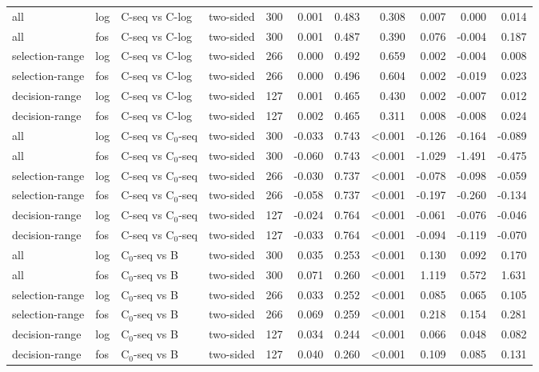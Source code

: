 \begin{longtable}{llllrrrrrrr}
all & log & C-seq vs C-log & two-sided & 300 & 0.001 & 0.483 & 0.308 & 0.007 & 0.000 & 0.014 \\
all & fos & C-seq vs C-log & two-sided & 300 & 0.001 & 0.487 & 0.390 & 0.076 & -0.004 & 0.187 \\
selection-range & log & C-seq vs C-log & two-sided & 266 & 0.000 & 0.492 & 0.659 & 0.002 & -0.004 & 0.008 \\
selection-range & fos & C-seq vs C-log & two-sided & 266 & 0.000 & 0.496 & 0.604 & 0.002 & -0.019 & 0.023 \\
decision-range & log & C-seq vs C-log & two-sided & 127 & 0.001 & 0.465 & 0.430 & 0.002 & -0.007 & 0.012 \\
decision-range & fos & C-seq vs C-log & two-sided & 127 & 0.002 & 0.465 & 0.311 & 0.008 & -0.008 & 0.024 \\
all & log & C-seq vs C$_0$-seq & two-sided & 300 & -0.033 & 0.743 & <0.001 & -0.126 & -0.164 & -0.089 \\
all & fos & C-seq vs C$_0$-seq & two-sided & 300 & -0.060 & 0.743 & <0.001 & -1.029 & -1.491 & -0.475 \\
selection-range & log & C-seq vs C$_0$-seq & two-sided & 266 & -0.030 & 0.737 & <0.001 & -0.078 & -0.098 & -0.059 \\
selection-range & fos & C-seq vs C$_0$-seq & two-sided & 266 & -0.058 & 0.737 & <0.001 & -0.197 & -0.260 & -0.134 \\
decision-range & log & C-seq vs C$_0$-seq & two-sided & 127 & -0.024 & 0.764 & <0.001 & -0.061 & -0.076 & -0.046 \\
decision-range & fos & C-seq vs C$_0$-seq & two-sided & 127 & -0.033 & 0.764 & <0.001 & -0.094 & -0.119 & -0.070 \\
all & log & C$_0$-seq vs B & two-sided & 300 & 0.035 & 0.253 & <0.001 & 0.130 & 0.092 & 0.170 \\
all & fos & C$_0$-seq vs B & two-sided & 300 & 0.071 & 0.260 & <0.001 & 1.119 & 0.572 & 1.631 \\
selection-range & log & C$_0$-seq vs B & two-sided & 266 & 0.033 & 0.252 & <0.001 & 0.085 & 0.065 & 0.105 \\
selection-range & fos & C$_0$-seq vs B & two-sided & 266 & 0.069 & 0.259 & <0.001 & 0.218 & 0.154 & 0.281 \\
decision-range & log & C$_0$-seq vs B & two-sided & 127 & 0.034 & 0.244 & <0.001 & 0.066 & 0.048 & 0.082 \\
decision-range & fos & C$_0$-seq vs B & two-sided & 127 & 0.040 & 0.260 & <0.001 & 0.109 & 0.085 & 0.131 \\

\end{longtable}
